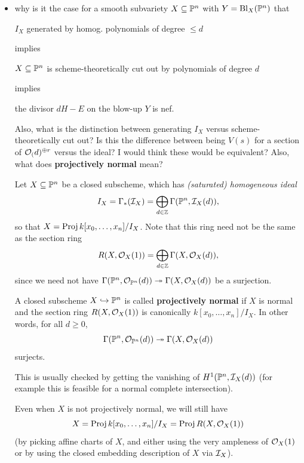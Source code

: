 \documentclass[12pt]{article}
\newcommand{\Bl}{\mathrm{Bl}}
\begin{document}
\begin{itemize}
    So, I'm satisfied that $p_*q^* L$ is correct at least on the complement of exceptional locus of the Mumford-Chow map (i.e., when $Z$ is a disjoint union). I'm not sure how to see this in general, ask Aaron {\color{red} also look up why $S^{[n]}$ is smooth... can we see this just using functor of points without using the construction?})
    
    \item {\color{blue} why is it the case for a smooth subvariety $X\subseteq \P^n$ with $Y=\Bl_X(\P^n)$ that
    \begin{center}$I_X$ generated by homog. polynomials of degree $\leq d$\end{center}
    implies
    \begin{center}
        $X\subseteq \P^n$ is scheme-theoretically cut out by polynomials of degree $d$
    \end{center}
    implies
    \begin{center}
        the divisor $dH-E$ on the blow-up $Y$ is nef.
    \end{center}
    Also, what is the distinction between generating $I_X$ versus scheme-theoretically cut out? Is this the difference between being $V(s)$ for a section of $\cO_(d)^{\oplus r}$ versus the ideal? I would think these would be equivalent? Also, what does \textbf{projectively normal} mean?
    }

    Let $X\subseteq \P^n$ be a closed subscheme, which has \textit{(saturated) homogeneous ideal}
    \[I_X = \Gamma_*(\cI_X) = \bigoplus_{d\in \Z} \Gamma(\P^n,\cI_X(d)),\]
    so that $X=\Proj k[x_0,\dots,x_n]/I_X$. Note that this ring need not be the same as the section ring
    \[R(X,\cO_X(1)) = \bigoplus_{d\in \Z} \Gamma(X,\cO_X(d)),\]
    since we need not have $\Gamma(\P^n,\cO_{\P^n}(d)) \twoheadrightarrow \Gamma(X,\cO_X(d))$ be a surjection.
    \begin{defn}
        A closed subscheme $X\hookrightarrow \P^n$ is called \textbf{projectively normal} if $X$ is normal and the section ring $R(X,\cO_X(1))$ is canonically $k[x_0,\dots,x_n]/I_X$. In other words, for all $d\geq 0$,
        \[\Gamma(\P^n,\cO_{\P^n}(d)) \twoheadrightarrow \Gamma(X,\cO_X(d))\]
        surjects.
    \end{defn}
    This is usually checked by getting the vanishing of $H^1(\P^n,\cI_X(d))$ (for example this is feasible for a normal complete intersection).
    
    Even when $X$ is not projectively normal, we will still have
    \[X = \Proj k[x_0,\dots,x_n]/I_X = \Proj R(X,\cO_X(1))\]
    (by picking affine charts of $X$, and either using the very ampleness of $\cO_X(1)$ or by using the closed embedding description of $X$ via $\cI_X$).


\end{itemize}
\end{document}
